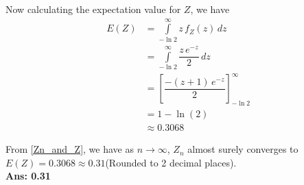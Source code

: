 \documentclass[journal,12pt,twocolumn]{IEEEtran}
\begin{document}
Now calculating the expectation value for $Z$, we have
\begin{align}
    E(Z)&=\int\limits_{-\ln{2}}^{\infty}z\,f_Z(z)\,dz\\
    &=\int\limits_{-\ln{2}}^{\infty}\dfrac{z\,e^{-z}}{2}\,dz\\
    &=\left[ \dfrac{-(z+1)\,e^{-z}}{2} \right]_{-\ln{2}}^\infty\\
    &=1-\ln{(2)}\\
    &\approx0.3068
\end{align}
\par From \eqref{Zn_and_Z}, we have as $n \to \infty$, $Z_n$  almost surely converges to $ E(Z)=0.3068\approx0.31$(Rounded to 2 decimal places).\\
\textbf{Ans: 0.31}
\end{document}
